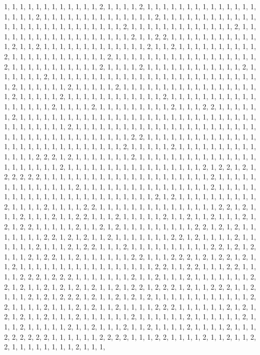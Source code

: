 \documentclass[
]{article}
\begin{document}
\begin{Schunk}
\begin{Soutput}
1, 1, 1, 1, 1, 1, 1, 1, 1, 1, 1, 1, 2, 1, 1, 1, 1, 2, 1, 1, 1, 1, 1, 1, 1, 1, 1, 1, 1, 1, 1, 1, 1, 1, 1, 1, 2, 1, 1, 1, 1, 1, 1, 1, 1, 1, 1, 1, 1, 1, 1, 2, 1, 1, 1, 1, 1, 1, 1, 1, 1, 1, 1, 1, 1, 1, 1, 1, 1, 1, 1, 1, 1, 1, 1, 1, 1, 1, 1, 2, 1, 1, 1, 1, 1, 1, 1, 1, 1, 1, 1, 1, 1, 2, 1, 1, 1, 1, 1, 1, 1, 1, 1, 1, 1, 1, 1, 1, 1, 1, 1, 1, 2, 1, 1, 2, 2, 1, 1, 1, 1, 1, 1, 1, 1, 1, 1, 1, 1, 2, 1, 1, 2, 1, 1, 1, 1, 1, 1, 1, 1, 1, 1, 1, 1, 1, 2, 1, 1, 2, 1, 1, 1, 1, 1, 1, 1, 1, 1, 1, 2, 1, 1, 1, 1, 1, 1, 1, 1, 1, 1, 1, 1, 2, 1, 1, 1, 1, 1, 1, 1, 1, 1, 1, 1, 1, 1, 1, 1, 1, 1, 1, 2, 1, 1, 1, 1, 1, 1, 1, 1, 1, 1, 1, 2, 1, 1, 1, 1, 2, 1, 1, 1, 1, 1, 1, 1, 1, 1, 1, 1, 1, 2, 1, 1, 1, 1, 1, 1, 2, 1, 1, 1, 1, 1, 1, 1, 1, 1, 1, 1, 1, 1, 1, 1, 1, 1, 1, 1, 1, 1, 1, 1, 1, 1, 1, 1, 2, 1, 1, 1, 1, 1, 1, 2, 1, 1, 1, 1, 1, 2, 1, 1, 1, 1, 1, 1, 1, 1, 1, 1, 1, 1, 1, 1, 1, 1, 1, 1, 2, 1, 1, 1, 1, 1, 2, 1, 1, 1, 1, 1, 1, 1, 1, 1, 1, 1, 1, 2, 1, 1, 1, 1, 1, 1, 1, 1, 1, 1, 1, 1, 1, 1, 1, 1, 1, 2, 1, 1, 1, 1, 2, 1, 1, 1, 1, 1, 1, 1, 1, 1, 2, 1, 1, 1, 2, 2, 1, 1, 1, 1, 1, 1, 2, 1, 1, 1, 1, 1, 1, 1, 1, 1, 1, 1, 1, 1, 1, 1, 1, 1, 1, 1, 1, 1, 1, 1, 1, 1, 1, 1, 1, 1, 1, 1, 1, 1, 1, 1, 1, 1, 1, 2, 1, 1, 1, 1, 1, 1, 1, 1, 1, 1, 1, 1, 1, 1, 1, 1, 1, 1, 1, 1, 1, 1, 1, 1, 1, 1, 1, 1, 1, 1, 1, 1, 1, 1, 1, 1, 1, 1, 1, 2, 2, 1, 1, 1, 1, 1, 1, 1, 1, 1, 1, 1, 1, 1, 1, 1, 1, 1, 1, 1, 1, 1, 1, 1, 1, 1, 1, 1, 1, 1, 2, 1, 1, 1, 1, 1, 2, 1, 1, 1, 1, 1, 1, 1, 1, 1, 1, 1, 1, 1, 1, 2, 2, 2, 1, 2, 1, 1, 1, 1, 1, 1, 1, 2, 1, 1, 1, 1, 1, 1, 1, 1, 1, 1, 1, 1, 1, 1, 1, 1, 1, 1, 1, 1, 1, 1, 2, 1, 1, 1, 1, 1, 1, 1, 1, 1, 1, 1, 1, 1, 1, 1, 1, 1, 2, 1, 2, 2, 1, 2, 1, 2, 2, 2, 2, 2, 1, 1, 1, 1, 1, 1, 1, 1, 1, 1, 1, 1, 1, 1, 1, 1, 1, 1, 1, 1, 1, 2, 1, 1, 1, 1, 1, 1, 1, 1, 1, 1, 1, 1, 1, 1, 2, 1, 1, 1, 1, 1, 1, 1, 1, 1, 1, 1, 1, 1, 1, 1, 1, 2, 1, 1, 1, 1, 1, 1, 1, 1, 1, 1, 1, 1, 1, 1, 1, 1, 1, 1, 1, 1, 1, 1, 1, 1, 2, 1, 2, 1, 1, 1, 1, 1, 1, 1, 1, 1, 1, 2, 1, 1, 1, 1, 2, 1, 1, 1, 1, 2, 2, 1, 1, 1, 1, 1, 1, 1, 1, 1, 1, 1, 1, 1, 1, 1, 2, 2, 1, 2, 1, 1, 1, 2, 1, 1, 1, 2, 1, 1, 2, 2, 1, 1, 1, 2, 1, 1, 1, 1, 1, 2, 1, 1, 2, 1, 1, 2, 1, 1, 1, 2, 1, 2, 1, 2, 2, 1, 1, 1, 1, 1, 2, 1, 1, 2, 1, 2, 1, 1, 1, 1, 1, 1, 1, 1, 1, 2, 2, 1, 2, 1, 2, 1, 1, 1, 1, 1, 1, 1, 2, 2, 1, 2, 1, 2, 1, 1, 2, 1, 1, 1, 1, 1, 1, 1, 2, 2, 1, 2, 1, 1, 1, 1, 2, 1, 1, 1, 1, 1, 1, 2, 1, 1, 1, 2, 1, 2, 2, 1, 1, 1, 2, 1, 1, 1, 1, 1, 1, 1, 1, 1, 1, 2, 2, 1, 2, 1, 2, 1, 1, 1, 2, 1, 2, 2, 1, 1, 2, 1, 1, 1, 1, 1, 1, 2, 2, 1, 1, 1, 2, 2, 2, 1, 2, 1, 2, 2, 1, 2, 1, 1, 2, 1, 1, 1, 1, 1, 1, 1, 1, 1, 1, 1, 1, 1, 1, 1, 1, 1, 2, 2, 1, 1, 2, 2, 1, 1, 1, 2, 2, 1, 1, 1, 1, 2, 2, 2, 1, 2, 2, 2, 1, 1, 1, 1, 1, 1, 1, 2, 1, 1, 2, 1, 1, 1, 2, 1, 1, 1, 1, 1, 1, 1, 2, 2, 1, 2, 1, 1, 2, 1, 2, 1, 2, 1, 2, 1, 1, 2, 1, 2, 2, 1, 2, 2, 2, 1, 2, 1, 1, 2, 2, 2, 1, 1, 2, 1, 1, 1, 2, 1, 2, 1, 2, 2, 2, 1, 2, 1, 1, 2, 1, 2, 1, 2, 1, 1, 1, 1, 1, 1, 1, 1, 1, 1, 1, 1, 2, 2, 1, 1, 1, 1, 2, 1, 1, 1, 2, 1, 2, 1, 1, 2, 1, 1, 1, 1, 2, 2, 2, 1, 1, 1, 1, 1, 1, 2, 1, 2, 1, 2, 1, 2, 1, 1, 2, 1, 1, 1, 2, 1, 1, 1, 1, 1, 1, 2, 1, 1, 1, 1, 1, 1, 2, 1, 1, 1, 1, 1, 1, 2, 1, 1, 1, 2, 1, 1, 1, 1, 1, 2, 1, 1, 2, 1, 1, 1, 2, 1, 1, 2, 1, 1, 1, 1, 2, 1, 1, 1, 1, 2, 1, 1, 1, 2, 2, 2, 2, 2, 2, 1, 1, 1, 1, 1, 1, 2, 2, 2, 2, 1, 1, 1, 2, 2, 1, 1, 1, 1, 2, 1, 1, 2, 1, 1, 2, 2, 1, 1, 1, 1, 1, 1, 1, 1, 2, 1, 1, 1, 
\end{Soutput}
\end{Schunk}
\end{document}
